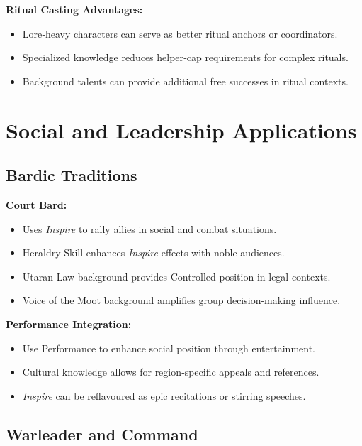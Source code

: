 \textbf{Ritual Casting Advantages:}
\begin{itemize}
    \item Lore‑heavy characters can serve as better ritual anchors or coordinators.
    \item Specialized knowledge reduces helper‑cap requirements for complex rituals.
    \item Background talents can provide additional free successes in ritual contexts.
\end{itemize}

\section{Social and Leadership Applications}\label{sec:social_applications}

\subsection{Bardic Traditions}\label{subsec:bardic_traditions}

\textbf{Court Bard:}
\begin{itemize}
    \item Uses \emph{Inspire} to rally allies in social and combat situations.
    \item Heraldry Skill enhances \emph{Inspire} effects with noble audiences.
    \item Utaran Law background provides Controlled position in legal contexts.
    \item Voice of the Moot background amplifies group decision‑making influence.
\end{itemize}

\textbf{Performance Integration:}
\begin{itemize}
    \item Use Performance to enhance social position through entertainment.
    \item Cultural knowledge allows for region‑specific appeals and references.
    \item \emph{Inspire} can be reflavoured as epic recitations or stirring speeches.
\end{itemize}

\subsection{Warleader and Command}\label{subsec:warleader_command}

